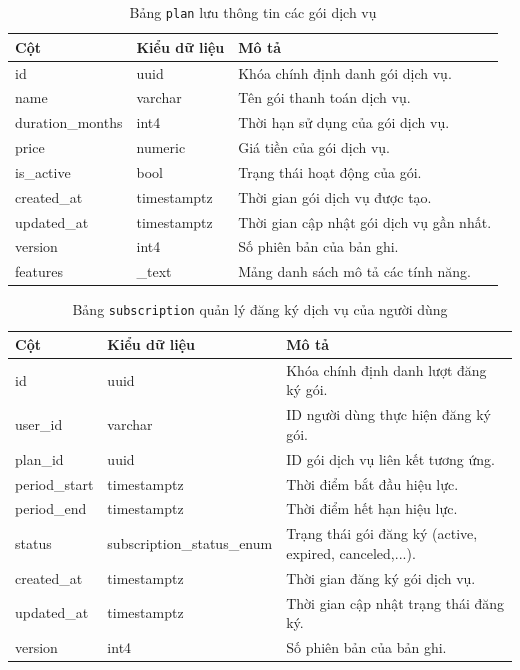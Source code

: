 \begin{table}[H]
\centering
\begin{tabular}{|l|l|p{6cm}|}
\hline
\textbf{Cột} & \textbf{Kiểu dữ liệu} & \textbf{Mô tả} \\ \hline
id & uuid & Khóa chính định danh gói dịch vụ. \\ \hline
name & varchar & Tên gói thanh toán dịch vụ. \\ \hline
duration\_months & int4 & Thời hạn sử dụng của gói dịch vụ. \\ \hline
price & numeric & Giá tiền của gói dịch vụ. \\ \hline
is\_active & bool & Trạng thái hoạt động của gói. \\ \hline
created\_at & timestamptz & Thời gian gói dịch vụ được tạo. \\ \hline
updated\_at & timestamptz & Thời gian cập nhật gói dịch vụ gần nhất. \\ \hline
version & int4 & Số phiên bản của bản ghi. \\ \hline
features & \_text & Mảng danh sách mô tả các tính năng. \\ \hline
\end{tabular}
\caption{Bảng \texttt{plan} lưu thông tin các gói dịch vụ}
\end{table}

\begin{table}[H]
\centering
\begin{tabular}{|l|l|p{6cm}|}
\hline
\textbf{Cột} & \textbf{Kiểu dữ liệu} & \textbf{Mô tả} \\ \hline
id & uuid & Khóa chính định danh lượt đăng ký gói. \\ \hline
user\_id & varchar & ID người dùng thực hiện đăng ký gói. \\ \hline
plan\_id & uuid & ID gói dịch vụ liên kết tương ứng. \\ \hline
period\_start & timestamptz & Thời điểm bắt đầu hiệu lực. \\ \hline
period\_end & timestamptz & Thời điểm hết hạn hiệu lực. \\ \hline
status & subscription\_status\_enum & Trạng thái gói đăng ký (active, expired, canceled,...). \\ \hline
created\_at & timestamptz & Thời gian đăng ký gói dịch vụ. \\ \hline
updated\_at & timestamptz & Thời gian cập nhật trạng thái đăng ký. \\ \hline
version & int4 & Số phiên bản của bản ghi. \\ \hline
\end{tabular}
\caption{Bảng \texttt{subscription} quản lý đăng ký dịch vụ của người dùng}
\end{table}

